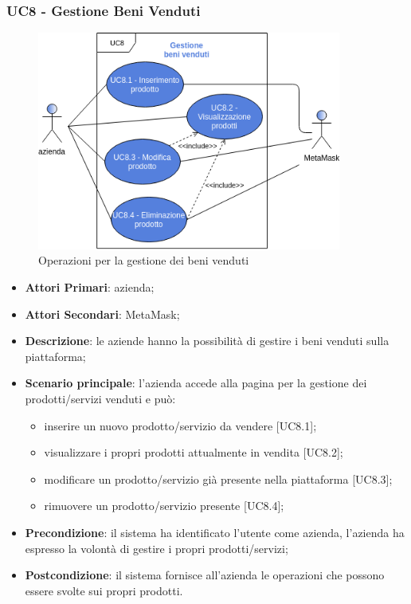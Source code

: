 \subsubsection{UC8 - Gestione Beni Venduti}
\begin{figure}[h]
	\includegraphics[width=10cm]{res/images/UC8-Generale.png}
	\centering
	\caption{Operazioni per la gestione dei beni venduti}
\end{figure}
\begin{itemize}
	\item \textbf{Attori Primari}: azienda;
	\item \textbf{Attori Secondari}: MetaMask\glo;
	\item \textbf{Descrizione}: le aziende hanno la possibilità di gestire i beni venduti sulla piattaforma;
	\item \textbf{Scenario principale}: l'azienda accede alla pagina per la gestione dei prodotti/servizi venduti e può:
	\begin{itemize}
		\item inserire un nuovo prodotto/servizio da vendere [UC8.1];
		\item visualizzare i propri prodotti attualmente in vendita [UC8.2];
		\item modificare un prodotto/servizio già presente nella piattaforma [UC8.3];
		\item rimuovere un prodotto/servizio presente [UC8.4]; 
	\end{itemize}
	\item \textbf{Precondizione}: il sistema ha identificato l'utente come azienda, l'azienda ha espresso la volontà di gestire i propri prodotti/servizi;
	\item \textbf{Postcondizione}: il sistema fornisce all'azienda le operazioni che possono essere svolte sui propri prodotti.	
\end{itemize}

